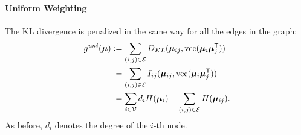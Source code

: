 \paragraph{Uniform Weighting} The \ac{KL} divergence is penalized in the same way
for all the edges in the graph:
\begin{align}
    g^{\mathit{uni}}(\bm{\mu}) & := \sum_{(i,j) \in \mathcal{E}}
    D_{KL}(\bm{\mu}_{ij}, \mathrm{vec}(\bm{\mu}_{i}
    \bm{\mu}_{j}^{\mathsf{T}}))
    \label{eq:lpqp:penalty_uniform}\\
    &   \phantom{:} = \sum_{(i,j) \in \mathcal{E}} I_{ij}(\bm{\mu}_{ij},
    \mathrm{vec}(\bm{\mu}_i \bm{\mu}_j^{\mathsf{T}}))\notag\\
    &   \phantom{:} =
    \sum_{i\in\mathcal{V}} d_i H(\bm{\mu}_{i})
    -\sum_{(i,j)\in\mathcal{E}} H(\bm{\mu}_{ij}).\notag
\end{align}
As before, $d_i$ denotes the degree of the $i$-th node.

